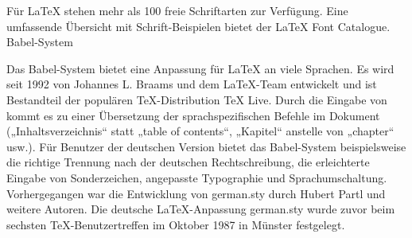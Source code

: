 Für LaTeX stehen mehr als 100 freie Schriftarten zur Verfügung. Eine umfassende Übersicht mit Schrift-Beispielen bietet der LaTeX Font Catalogue.
Babel-System

Das Babel-System bietet eine Anpassung für LaTeX an viele Sprachen. Es wird seit 1992 von Johannes L. Braams und dem LaTeX-Team entwickelt und ist Bestandteil der populären TeX-Distribution TeX Live. Durch die Eingabe von kommt es zu einer Übersetzung der sprachspezifischen Befehle im Dokument („Inhaltsverzeichnis“ statt „table of contents“, „Kapitel“ anstelle von „chapter“ usw.). Für Benutzer der deutschen Version bietet das Babel-System beispielsweise die richtige Trennung nach der deutschen Rechtschreibung, die erleichterte Eingabe von Sonderzeichen, angepasste Typographie und Sprachumschaltung. Vorhergegangen war die Entwicklung von german.sty durch Hubert Partl und weitere Autoren.\cite{Babel}\cite{Kopka} Die deutsche LaTeX-Anpassung german.sty wurde zuvor beim sechsten TeX-Benutzertreffen im Oktober 1987 in Münster festgelegt.